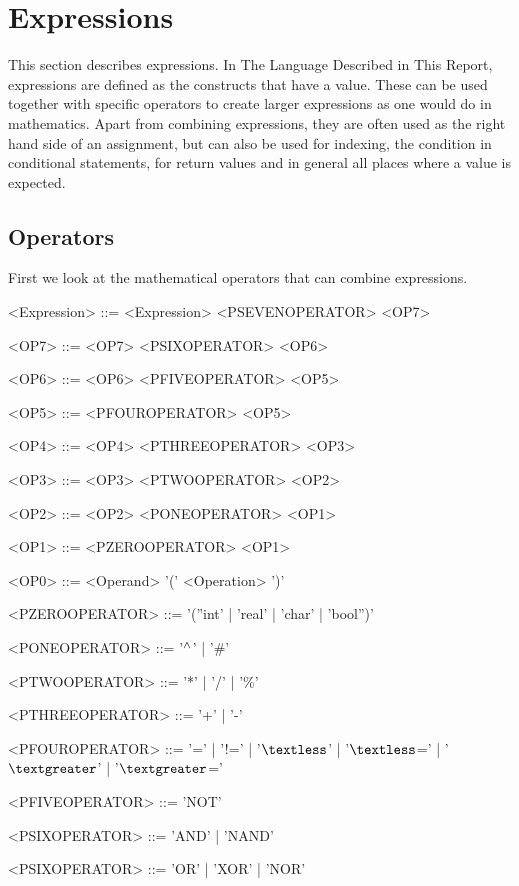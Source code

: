 \section{Expressions}
\label{sec:Expressions}
This section describes expressions. In The Language Described in This Report, expressions are defined as the constructs that have a value. These can be used together with specific operators to create larger expressions as one would do in mathematics. Apart from combining expressions, they are often used as the right hand side of an assignment, but can also be used for indexing, the condition in conditional statements, for return values and in general all places where a value is expected.

\subsection{Operators}\label{subsec:operators}
First we look at the mathematical operators that can combine expressions.
\setlength{\grammarindent}{100pt}
\begin{grammar}
<Expression> ::= <Expression> <PSEVENOPERATOR> <OP7>

<OP7> ::= <OP7> <PSIXOPERATOR> <OP6>

<OP6> ::= <OP6> <PFIVEOPERATOR> <OP5>

<OP5> ::= <PFOUROPERATOR> <OP5>

<OP4> ::= <OP4> <PTHREEOPERATOR> <OP3>

<OP3> ::= <OP3> <PTWOOPERATOR> <OP2>

<OP2> ::= <OP2> <PONEOPERATOR> <OP1>

<OP1> ::= <PZEROOPERATOR> <OP1>

<OP0> ::= <Operand>
 \alt '(' <Operation> ')'

<PZEROOPERATOR> ::= '(''int' | 'real' | 'char' | 'bool'')'

<PONEOPERATOR> ::= '$\mathbin{^\wedge{}}$' | '\#'

<PTWOOPERATOR> ::= '*' | '/' | '\%'

<PTHREEOPERATOR> ::= '+' | '-'

<PFOUROPERATOR> ::= '=' | '!=' | '$\textless$' | '$\textless$=' | '$\textgreater$' | '$\textgreater$='

<PFIVEOPERATOR> ::= 'NOT'

<PSIXOPERATOR> ::= 'AND' | 'NAND'

<PSIXOPERATOR> ::= 'OR' | 'XOR' | 'NOR'
\end{grammar}
